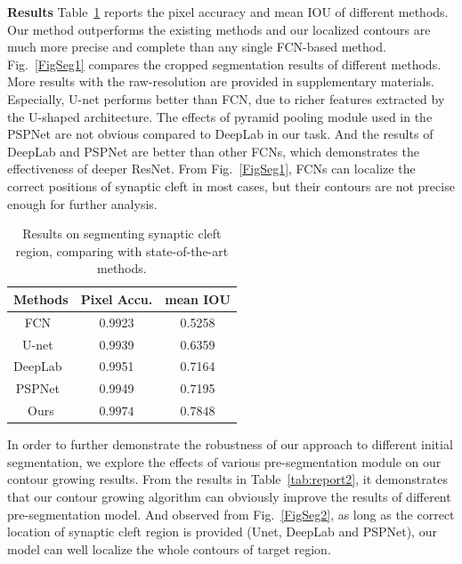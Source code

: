 \noindent\textbf{Results}
Table~\ref{tab:report1} reports the pixel accuracy and mean IOU of different methods.
Our method outperforms the existing methods and our localized contours are much more precise and complete than any single FCN-based method.
Fig.~\ref{FigSeg1} compares the cropped segmentation results of different methods.
More results with the raw-resolution are provided in supplementary materials. 
%
Especially, U-net performs better than FCN, due to richer features extracted by the U-shaped architecture.
%
The effects of pyramid pooling module used in the PSPNet are not obvious compared to DeepLab in our task.
And the results of DeepLab and PSPNet are better than other FCNs, which demonstrates the effectiveness of deeper ResNet.
From Fig.~\ref{FigSeg1}, FCNs can localize the correct positions of synaptic cleft in most cases, but their contours are not precise enough for further analysis.

\begin{table}[t]
\begin{center}
\caption{Results on segmenting synaptic cleft region, comparing with state-of-the-art methods.} \label{tab:report1}
\begin{tabular}{|c|c|c|}
  \hline
  Methods & Pixel Accu. & mean IOU
  \\
  \hline
  FCN~\cite{Long2015} & 0.9923 & 0.5258 \\
  U-net~\cite{Ronneberger2015} &  0.9939 & 0.6359 \\
  DeepLab~\cite{Chen2016a} & 0.9951 & 0.7164 \\
  PSPNet~\cite{Zhao2016} & 0.9949 & 0.7195 \\
  Ours & $\mathbf{0.9974}$ & $\mathbf{0.7848}$ \\
  \hline
\end{tabular}
\end{center}
\end{table}


In order to further demonstrate the robustness of our approach to different initial segmentation, we explore the effects of various pre-segmentation module on our contour growing results.
%
From the results in Table~\ref{tab:report2}, it demonstrates that our contour growing algorithm can obviously improve the results of different pre-segmentation model.
And observed from Fig.~\ref{FigSeg2}, as long as the correct location of synaptic cleft region is provided (Unet, DeepLab and PSPNet), our model can well localize the whole contours of target region.

